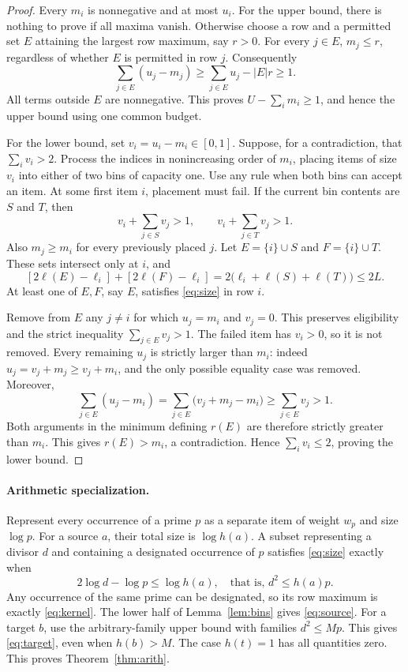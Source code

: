 \documentclass[a4paper,11pt]{article}
\theoremstyle{remark}\newtheorem{remark}[theorem]{Remark}
\begin{document}
\begin{proof}
Every $m_i$ is nonnegative and at most $u_i$. For the upper bound, there is nothing to prove if all maxima vanish. Otherwise choose a row and a permitted set $E$ attaining the largest row maximum, say $r>0$. For every $j\in E$, $m_j\le r$, regardless of whether $E$ is permitted in row $j$. Consequently
\[
 \sum_{j\in E}(u_j-m_j)
 \ge\sum_{j\in E}u_j-|E|r\ge1.
\]
All terms outside $E$ are nonnegative. This proves $U-\sum_i m_i\ge1$, and hence the upper bound using one common budget.

For the lower bound, set $v_i=u_i-m_i\in[0,1]$. Suppose, for a contradiction, that $\sum_i v_i>2$. Process the indices in nonincreasing order of $m_i$, placing items of size $v_i$ into either of two bins of capacity one. Use any rule when both bins can accept an item. At some first item $i$, placement must fail. If the current bin contents are $S$ and $T$, then
\begin{equation}\label{eq:failed}
 v_i+\sum_{j\in S}v_j>1,\qquad
 v_i+\sum_{j\in T}v_j>1.
\end{equation}
Also $m_j\ge m_i$ for every previously placed $j$. Let $E=\{i\}\cup S$ and $F=\{i\}\cup T$. These sets intersect only at $i$, and
\[
 [2\ell(E)-\ell_i]+[2\ell(F)-\ell_i]
   =2\bigl(\ell_i+\ell(S)+\ell(T)\bigr)\le2L.
\]
At least one of $E,F$, say $E$, satisfies \eqref{eq:size} in row $i$.

Remove from $E$ any $j\ne i$ for which $u_j=m_i$ and $v_j=0$. This preserves eligibility and the strict inequality $\sum_{j\in E}v_j>1$. The failed item has $v_i>0$, so it is not removed. Every remaining $u_j$ is strictly larger than $m_i$: indeed $u_j=v_j+m_j\ge v_j+m_i$, and the only possible equality case was removed. Moreover,
\[
 \sum_{j\in E}(u_j-m_i)
 =\sum_{j\in E}\bigl(v_j+m_j-m_i\bigr)
 \ge\sum_{j\in E}v_j>1.
\]
Both arguments in the minimum defining $r(E)$ are therefore strictly greater than $m_i$. This gives $r(E)>m_i$, a contradiction. Hence $\sum_i v_i\le2$, proving the lower bound.
\end{proof}

\paragraph{Arithmetic specialization.}
Represent every occurrence of a prime $p$ as a separate item of weight $w_p$ and size $\log p$. For a source $a$, their total size is $\log h(a)$. A subset representing a divisor $d$ and containing a designated occurrence of $p$ satisfies \eqref{eq:size} exactly when
\[
 2\log d-\log p\le\log h(a),\quad\text{that is, }d^2\le h(a)p.
\]
Any occurrence of the same prime can be designated, so its row maximum is exactly \eqref{eq:kernel}. The lower half of Lemma~\ref{lem:bins} gives \eqref{eq:source}. For a target $b$, use the arbitrary-family upper bound with families $d^2\le Mp$. This gives \eqref{eq:target}, even when $h(b)>M$. The case $h(t)=1$ has all quantities zero. This proves Theorem~\ref{thm:arith}.
\end{document}
